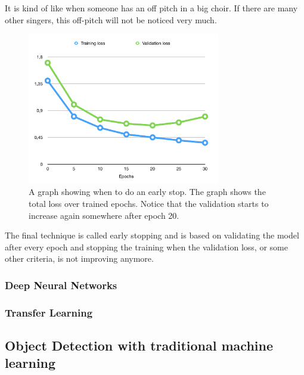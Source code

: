 It is kind of like when someone has an off pitch in a big choir. If there are many other singers, this off-pitch will not be noticed very much.

\begin{figure}[hbtp]
\begin{center}
\includegraphics[width = 0.75\textwidth]{./Images/early_stop.jpg} 
\caption{A graph showing when to do an early stop. The graph shows the total loss over trained epochs. Notice that the validation starts to increase again somewhere after epoch 20.}
\end{center}
\end{figure}

The final technique is called early stopping and is based on validating the model after every epoch and stopping the training when the validation loss, or some other criteria, is not improving anymore.

\subsubsection{Deep Neural Networks}

\subsubsection{Transfer Learning}


\subsection{Object Detection with traditional machine learning}

